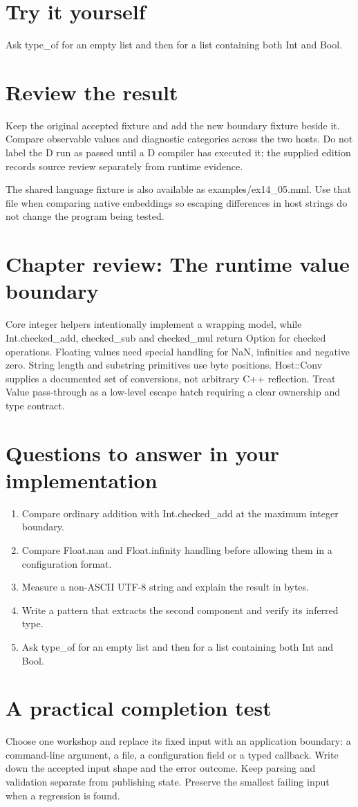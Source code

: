 \section*{Try it yourself}
Ask type\_of for an empty list and then for a list containing both Int and Bool.

\section*{Review the result}
Keep the original accepted fixture and add the new boundary fixture beside it. Compare observable values and diagnostic categories across the two hosts. Do not label the D run as passed until a D compiler has executed it; the supplied edition records source review separately from runtime evidence.

The shared language fixture is also available as examples/ex14\_05.mml. Use that file when comparing native embeddings so escaping differences in host strings do not change the program being tested.

\clearpage
\section*{Chapter review: The runtime value boundary}
Core integer helpers intentionally implement a wrapping model, while Int.checked\_add, checked\_sub and checked\_mul return Option for checked operations. Floating values need special handling for NaN, infinities and negative zero. String length and substring primitives use byte positions. Host::Conv supplies a documented set of conversions, not arbitrary C++ reflection. Treat Value pass-through as a low-level escape hatch requiring a clear ownership and type contract.

\section*{Questions to answer in your implementation}
\begin{enumerate}
\item Compare ordinary addition with Int.checked\_add at the maximum integer boundary.
\item Compare Float.nan and Float.infinity handling before allowing them in a configuration format.
\item Measure a non-ASCII UTF-8 string and explain the result in bytes.
\item Write a pattern that extracts the second component and verify its inferred type.
\item Ask type\_of for an empty list and then for a list containing both Int and Bool.
\end{enumerate}
\section*{A practical completion test}
Choose one workshop and replace its fixed input with an application boundary: a command-line argument, a file, a configuration field or a typed callback. Write down the accepted input shape and the error outcome. Keep parsing and validation separate from publishing state. Preserve the smallest failing input when a regression is found.

